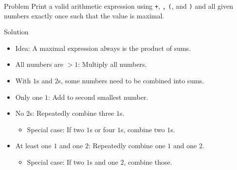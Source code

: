 \begin{frame}
    \frametitle{\problemtitle}
    \begin{block}{Problem}
        Print a valid arithmetic expression using \texttt+, \texttt*, \texttt(, and \texttt) and all given numbers exactly once such that the value is maximal.
    \end{block}

    \pause 
    \begin{block}{Solution}
        \begin{itemize}
            \item<+-> Idea: A maximal expression always is the product of sums. 
            \item<+-> All numbers are $> 1$: Multiply all numbers.
            \item<+-> With $1$s and $2$s, some numbers need to be combined into sums.
        \end{itemize}
        \vspace{-0.5em}
        \vspace{-0.5em}
        \begin{itemize}
            \item<+-> Only one $1$: 
            Add to second smallest number. 
            \item<+-> No $2$s: Repeatedly combine three $1$s. 
            \begin{itemize}
                \item<+-> Special case: If two $1$s or four $1$s, combine two $1$s.  
            \end{itemize}
            \item<+-> At least one $1$ and one $2$: 
            Repeatedly combine one $1$ and one $2$. 
            \begin{itemize}
                \item<+-> Special case: If two $1$s and one $2$, combine those.  
            \end{itemize}
        \end{itemize}
    \end{block}

    \solvestats
\end{frame}
